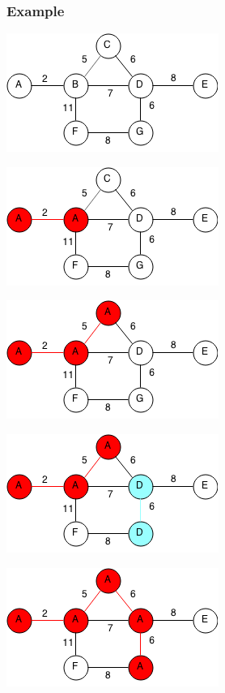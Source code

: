 \documentclass[11pt,oneside]{book}
\makeatletter
\def\maxwidth#1{\ifdim\Gin@nat@width>#1 #1\else\Gin@nat@width\fi}
\makeatother
\begin{document}
\subsubsection{Example}

\vspace{5px}\includegraphics[width=\maxwidth{\textwidth}]{kruskal.png}

\vspace{5px}\includegraphics[width=\maxwidth{\textwidth}]{kruskal2.png}

\vspace{5px}\includegraphics[width=\maxwidth{\textwidth}]{kruskal3.png}

\vspace{5px}\includegraphics[width=\maxwidth{\textwidth}]{kruskal4.png}

\vspace{5px}\includegraphics[width=\maxwidth{\textwidth}]{kruskal5.png}
\end{document}
